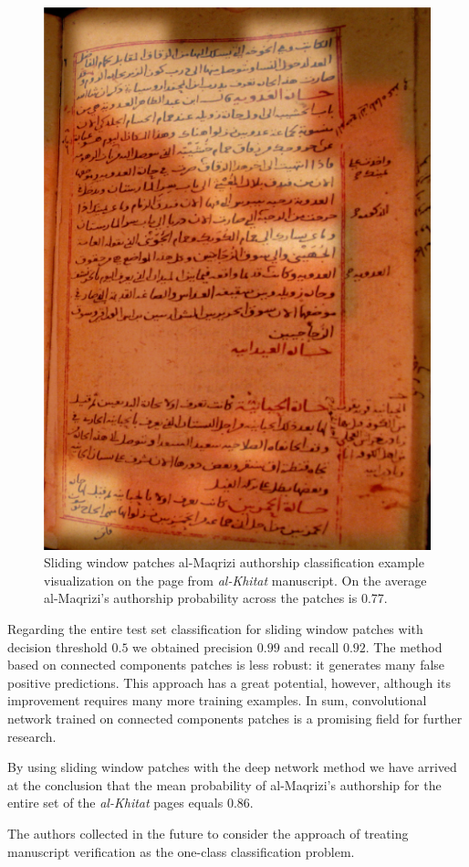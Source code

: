 \documentclass[conference,a4paper]{ieeetran}
\begin{document}
\begin{figure}[!t]
	\centering
  \includegraphics[width=0.49\linewidth]{figures/hitat_15_fixed.png}
   \caption{Sliding window patches al-Maqrizi authorship classification example visualization on the page from {\it al-Khitat} manuscript. On the average al-Maqrizi's authorship probability across the patches is 0.77.}
	\label{fig:al_maqrizi_classification_example_test_hitat}
\end{figure}

Regarding the entire test set classification for sliding window patches with decision threshold $0.5$ we obtained precision $0.99$ and recall $0.92$. The method based on connected components patches is less robust: it generates many false positive predictions. This approach has a great potential, however, although its improvement requires many more training examples. In sum, convolutional network trained on connected components patches is a promising field for further research.

By using sliding window patches with the deep network method we have arrived at the conclusion that the mean probability of al-Maqrizi's authorship for the entire set of the {\it al-Khitat} pages equals $0.86$. 

{\color{red} The authors collected in the future to consider the approach of treating manuscript verification as the one-class classification problem.}   
\end{document}
